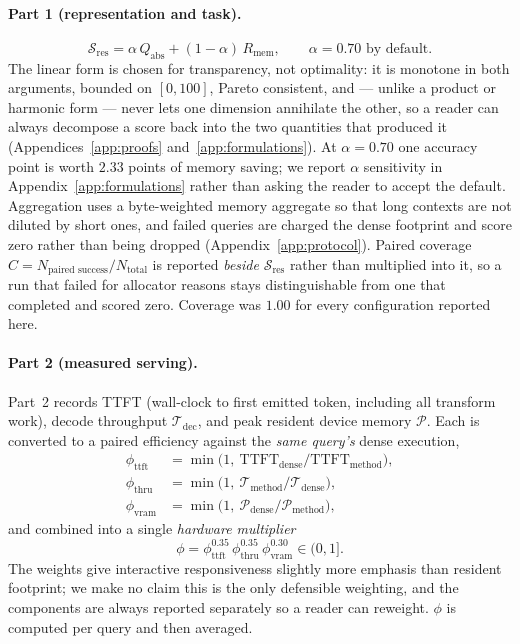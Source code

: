 \documentclass[sigplan,10pt,anonymous,review,nonacm]{acmart}
\newcommand{\Sres}{\mathcal{S}_{\text{res}}}
\begin{document}
\paragraph{Part 1 (representation and task).}
\begin{equation}
\label{eq:sres}
\Sres = \alpha \, Q_{\text{abs}} + (1 - \alpha)\, R_{\text{mem}},
\qquad \alpha = 0.70 \text{ by default}.
\end{equation}
The linear form is chosen for transparency, not optimality: it is monotone in
both arguments, bounded on $[0,100]$, Pareto consistent, and --- unlike a
product or harmonic form --- never lets one dimension annihilate the other, so
a reader can always decompose a score back into the two quantities that
produced it (Appendices~\ref{app:proofs} and~\ref{app:formulations}). At
$\alpha = 0.70$ one accuracy point is worth $2.33$ points of memory saving; we
report $\alpha$ sensitivity in Appendix~\ref{app:formulations} rather than
asking the reader to accept the default. Aggregation uses a byte-weighted
memory aggregate so that long contexts are not diluted by short ones, and
failed queries are charged the dense footprint and score zero rather than
being dropped (Appendix~\ref{app:protocol}). Paired coverage
$C = N_{\text{paired success}}/N_{\text{total}}$ is reported \emph{beside}
$\Sres$ rather than multiplied into it, so a run that failed for allocator
reasons stays distinguishable from one that completed and scored zero.
Coverage was $1.00$ for every configuration reported here.

\paragraph{Part 2 (measured serving).}
Part~2 records TTFT (wall-clock to first emitted token, including all
transform work), decode throughput $\mathcal{T}_{\text{dec}}$, and peak
resident device memory $\mathcal{P}$. Each is converted to a
paired efficiency against the \emph{same query's} dense execution,
\begin{equation}
\label{eq:phi_components}
\begin{aligned}
\phi_{\text{ttft}} &= \min\!\big(1,\ \text{TTFT}_{\text{dense}} / \text{TTFT}_{\text{method}}\big), \\[1pt]
\phi_{\text{thru}} &= \min\!\big(1,\ \mathcal{T}_{\text{method}} / \mathcal{T}_{\text{dense}}\big), \\[1pt]
\phi_{\text{vram}} &= \min\!\big(1,\ \mathcal{P}_{\text{dense}} / \mathcal{P}_{\text{method}}\big),
\end{aligned}
\end{equation}
and combined into a single \emph{hardware multiplier}
\begin{equation}
\label{eq:phi}
\phi = \phi_{\text{ttft}}^{0.35}\, \phi_{\text{thru}}^{0.35}\,
       \phi_{\text{vram}}^{0.30} \in (0, 1].
\end{equation}
The weights give interactive responsiveness slightly more emphasis than
resident footprint; we make no claim this is the only defensible weighting,
and the components are always reported separately so a reader can reweight.
$\phi$ is computed per query and then averaged.
\end{document}
